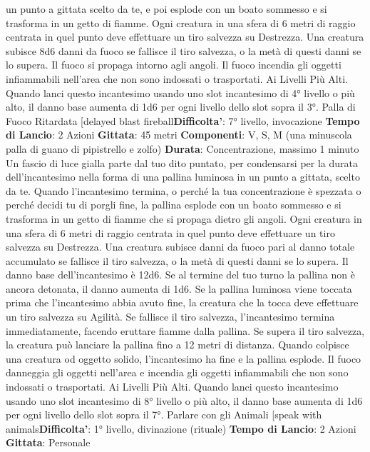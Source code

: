 \begin{multicols}{2}
un punto a gittata scelto da te, e poi esplode con un
boato sommesso e si trasforma in un getto di fiamme.
Ogni creatura in una sfera di 6 metri di raggio centrata
in quel punto deve effettuare un tiro salvezza su
Destrezza. Una creatura subisce 8d6 danni da fuoco se
fallisce il tiro salvezza, o la metà di questi danni se lo
supera.
Il fuoco si propaga intorno agli angoli. Il fuoco incendia
gli oggetti infiammabili nell’area che non sono indossati
o trasportati.
Ai Livelli Più Alti. Quando lanci questo incantesimo
usando uno slot incantesimo di 4° livello o più alto, il
danno base aumenta di 1d6 per ogni livello dello slot
sopra il 3°.
Palla di Fuoco Ritardata
[delayed blast fireball\textbf{Difficolta'}:
7° livello, invocazione
\textbf{Tempo di Lancio}: 2 Azioni
\textbf{Gittata}: 45 metri
\textbf{Componenti}: V, S, M (una minuscola palla di guano di
pipistrello e zolfo)
\textbf{Durata}: Concentrazione, massimo 1 minuto
Un fascio di luce gialla parte dal tuo dito puntato, per
condensarsi per la durata dell’incantesimo nella forma
di una pallina luminosa in un punto a gittata, scelto da
te. Quando l’incantesimo termina, o perché la tua
concentrazione è spezzata o perché decidi tu di porgli
fine, la pallina esplode con un boato sommesso e si
trasforma in un getto di fiamme che si propaga dietro gli
angoli. Ogni creatura in una sfera di 6 metri di raggio
centrata in quel punto deve effettuare un tiro salvezza
su Destrezza. Una creatura subisce danni da fuoco pari
al danno totale accumulato se fallisce il tiro salvezza, o
la metà di questi danni se lo supera.
Il danno base dell’incantesimo è 12d6. Se al termine del
tuo turno la pallina non è ancora detonata, il danno
aumenta di 1d6.
Se la pallina luminosa viene toccata prima che
l’incantesimo abbia avuto fine, la creatura che la tocca
deve effettuare un tiro salvezza su Agilità. Se
fallisce il tiro salvezza, l’incantesimo termina
immediatamente, facendo eruttare fiamme dalla pallina.
Se supera il tiro salvezza, la creatura può lanciare la
pallina fino a 12 metri di distanza. Quando colpisce una
creatura od oggetto solido, l’incantesimo ha fine e la
pallina esplode.
Il fuoco danneggia gli oggetti nell’area e incendia gli
oggetti infiammabili che non sono indossati o
trasportati.
Ai Livelli Più Alti. Quando lanci questo incantesimo
usando uno slot incantesimo di 8° livello o più alto, il
danno base aumenta di 1d6 per ogni livello dello slot
sopra il 7°.
Parlare con gli Animali
[speak with animals\textbf{Difficolta'}:
1° livello, divinazione (rituale)
\textbf{Tempo di Lancio}: 2 Azioni
\textbf{Gittata}: Personale

\end{multicols}
